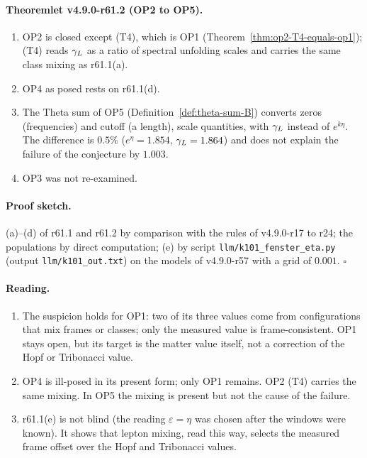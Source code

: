 \paragraph{Theoremlet v4.9.0-r61.2 (OP2 to OP5).}
\begin{enumerate}[leftmargin=2em]
\item[(a)] OP2 is closed except (T4), which is OP1 (Theorem~\ref{thm:op2-T4-equals-op1}); (T4) reads \(\gamma_L\) as a ratio of spectral unfolding scales and carries the same
class mixing as r61.1(a).
\item[(b)] OP4 as posed rests on r61.1(d).
\item[(c)] The Theta sum of OP5 (Definition~\ref{def:theta-sum-B}) converts zeros (frequencies) and cutoff (a length), scale quantities, with \(\gamma_L\) instead of \(e^{k\eta}\).
The difference is \(0.5\%\) (\(e^\eta=1.854\), \(\gamma_L=1.864\)) and does not explain the failure of the conjecture by \(1.003\).
\item[(d)] OP3 was not re-examined.
\end{enumerate}

\paragraph{Proof sketch.}
(a)--(d) of r61.1 and r61.2 by comparison with the rules of v4.9.0-r17 to r24; the populations by direct computation; (e) by script \texttt{llm/k101\_fenster\_eta.py}
(output \texttt{llm/k101\_out.txt}) on the models of v4.9.0-r57 with a grid of \(0.001\).  \(\square\)

\paragraph{Reading.}
\begin{enumerate}[leftmargin=2em]
\item The suspicion holds for OP1: two of its three values come from configurations that mix frames or classes; only the measured value is frame-consistent.  OP1 stays
open, but its target is the matter value itself, not a correction of the Hopf or Tribonacci value.
\item OP4 is ill-posed in its present form; only OP1 remains.  OP2 (T4) carries the same mixing.  In OP5 the mixing is present but not the cause of the failure.
\item r61.1(e) is not blind (the reading \(\varepsilon=\eta\) was chosen after the windows were known).  It shows that lepton mixing, read this way, selects the measured
frame offset over the Hopf and Tribonacci values.
\end{enumerate}

